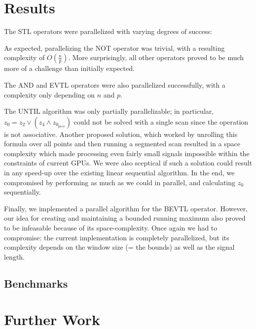 \documentclass[a4paper,10pt]{article}
\renewcommand{\And}{\wedge}
\newcommand{\Or}{\vee}
\begin{document}
\section{Results}

The STL operators were parallelized with varying degrees of success:

As expected, parallelizing the NOT operator was trivial, with a resulting complexity of $O(\frac{n}{p})$. More surprisingly, all other
operators proved to be much more of a challenge than initially expected.

The AND and EVTL operators were also parallelized successfully, with a complexity only depending on $n$ and $p$.

The UNTIL algorithm was only partially parallelizable; in particular,
$z_0 = z_2 \Or (z_4 \And z_{0_{prev}})$ could not be solved with a single scan since
the operation is not associative. Another proposed solution, which worked by unrolling this formula over all points
and then running a segmented scan resulted in a space complexity which made processing even fairly small signals impossible within the constraints of current GPUs. We were also sceptical if such a solution could result in any speed-up over
the existing linear sequential algorithm. In the end, we compromised by performing
as much as we could in parallel, and calculating $z_0$ sequentially.

Finally, we implemented a parallel algorithm for the BEVTL operator. However,
our idea for creating and maintaining a bounded running maximum also proved to
be infeasable because of its space-complexity. Once again we had to compromise:
the current implementation is completely parallelized, but its complexity depends
on the window size (= the bounds) as well as the signal length.


\subsection{Benchmarks}

\section{Further Work}
\end{document}
